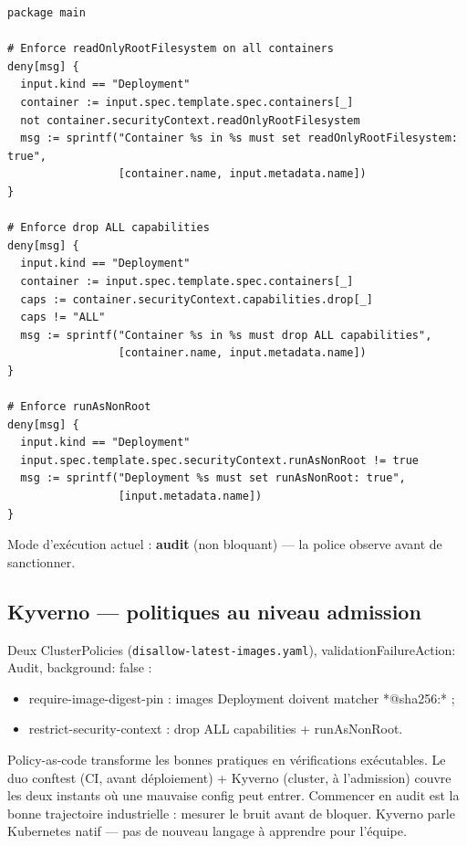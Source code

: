 \documentclass[12pt,a4paper]{article}
\begin{document}
\begin{lstlisting}[caption={security.rego --- intégralité}]
package main

# Enforce readOnlyRootFilesystem on all containers
deny[msg] {
  input.kind == "Deployment"
  container := input.spec.template.spec.containers[_]
  not container.securityContext.readOnlyRootFilesystem
  msg := sprintf("Container %s in %s must set readOnlyRootFilesystem: true",
                 [container.name, input.metadata.name])
}

# Enforce drop ALL capabilities
deny[msg] {
  input.kind == "Deployment"
  container := input.spec.template.spec.containers[_]
  caps := container.securityContext.capabilities.drop[_]
  caps != "ALL"
  msg := sprintf("Container %s in %s must drop ALL capabilities",
                 [container.name, input.metadata.name])
}

# Enforce runAsNonRoot
deny[msg] {
  input.kind == "Deployment"
  input.spec.template.spec.securityContext.runAsNonRoot != true
  msg := sprintf("Deployment %s must set runAsNonRoot: true",
                 [input.metadata.name])
}
\end{lstlisting}

Mode d'exécution actuel : \textbf{audit} (non bloquant) --- la police observe avant de sanctionner.

\subsection{Kyverno --- politiques au niveau admission}
Deux ClusterPolicies (\texttt{disallow-latest-images.yaml}), validationFailureAction: Audit, background: false :
\begin{itemize}[itemsep=1pt]
  \item require-image-digest-pin : images Deployment doivent matcher *@sha256:* ;
  \item restrict-security-context : drop ALL capabilities + runAsNonRoot.
\end{itemize}

\begin{whybox}
Policy-as-code transforme les bonnes pratiques en vérifications exécutables. Le duo conftest (CI, avant déploiement) + Kyverno (cluster, à l'admission) couvre les deux instants où une mauvaise config peut entrer. Commencer en audit est la bonne trajectoire industrielle : mesurer le bruit avant de bloquer. Kyverno parle Kubernetes natif --- pas de nouveau langage à apprendre pour l'équipe.
\end{whybox}
\end{document}
